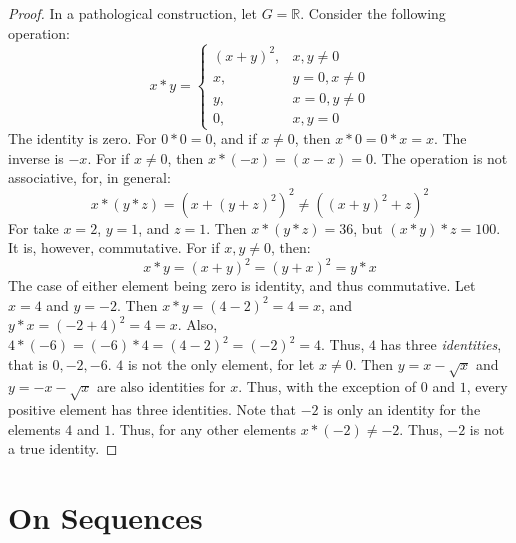         \begin{proof}
            In a pathological construction, let $G=\mathbb{R}$.
            Consider the following operation:
            \begin{equation}
                x*y=\begin{cases}
                        (x+y)^{2},&x,y\ne{0}\\
                        x,&y=0,x\ne{0}\\
                        y,&x=0,y\ne{0}\\
                        0,&x,y=0
                    \end{cases}
            \end{equation}
        The identity is zero. For $0*0 = 0$, and if $x\ne 0$, then
        $x*0 = 0*x = x$. The inverse is $-x$. For if $x\ne 0$,
        then $x*(\minus{x})=(x-x)=0$. The operation is not
        associative, for, in general:
        \begin{equation}
            x*(y*z)=(x+(y+z)^{2})^{2}
            \ne((x+y)^{2}+z)^{2}
        \end{equation}
        For take $x=2$, $y=1$, and $z=1$. Then $x*(y*z)=36$,
        but $(x*y)*z=100$. It is, however, commutative.
        For if $x,y\ne{0}$, then:
        \begin{equation}
            x*y=(x+y)^{2}=(y+x)^{2}=y*x
        \end{equation}
        The case of either element being zero is identity,
        and thus commutative. Let $x=4$ and $y=\minus{2}$.
        Then $x*y=(4-2)^{2}=4=x$, and $y*x=(\minus{2}+4)^{2}=4=x$.
        Also, $4*(\minus{6})=(\minus{6})*4=(4-2)^{2}=(\minus{2})^2=4$.
        Thus, $4$ has three \textit{identities}, that is $0,\minus{2},\minus{6}$.
        $4$ is not the only element, for let $x\ne{0}$.
        Then $y=x-\sqrt{x}$ and $y=\minus{x}-\sqrt{x}$ are also identities
        for $x$. Thus, with the exception of $0$ and $1$, every positive element
        has three identities. Note that $\minus{2}$ is only an identity
        for the elements $4$ and $1$. Thus, for any other
        elements $x*(-2)\ne\minus{2}$. Thus, $\minus{2}$ is not a true identity.
        \end{proof}
    \section{On Sequences}
